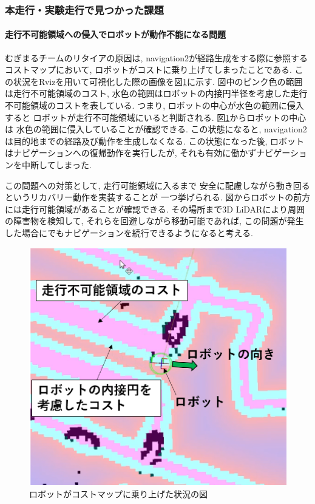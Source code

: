 \subsubsection{本走行・実験走行で見つかった課題}
\paragraph{走行不可能領域への侵入でロボットが動作不能になる問題}
むぎまるチームのリタイアの原因は, navigation2が経路生成をする際に参照する
コストマップにおいて, ロボットがコストに乗り上げてしまったことである. 
この状況をRvizを用いて可視化した際の画像を図\ref{fig:mugimaru_result}に示す. 
図中のピンク色の範囲は走行不可能領域のコスト, 
水色の範囲はロボットの内接円半径を考慮した走行不可能領域のコストを表している. 
つまり, ロボットの中心が水色の範囲に侵入すると
ロボットが走行不可能領域にいると判断される. 
図\ref{fig:mugimaru_result}からロボットの中心は
水色の範囲に侵入していることが確認できる. 
この状態になると, navigation2は目的地までの経路及び動作を生成しなくなる. 
この状態になった後, ロボットはナビゲーションへの復帰動作を実行したが, 
それも有効に働かずナビゲーションを中断してしまった. 

この問題への対策として, 走行可能領域に入るまで
安全に配慮しながら動き回るというリカバリー動作を実装することが
一つ挙げられる. 
図からロボットの前方には走行可能領域があることが確認できる. 
その場所まで3D LiDARにより周囲の障害物を検知して, 
それらを回避しながら移動可能であれば, 
この問題が発生した場合にでもナビゲーションを続行できるようになると考える. 
\begin{figure}[h]
  \begin{center}
  	\includegraphics[width=0.9\linewidth]{figs/mugimaru_result.eps}
  	\caption{ロボットがコストマップに乗り上げた状況の図} 
  	\label{fig:mugimaru_result}
  \end{center}
\end{figure}

